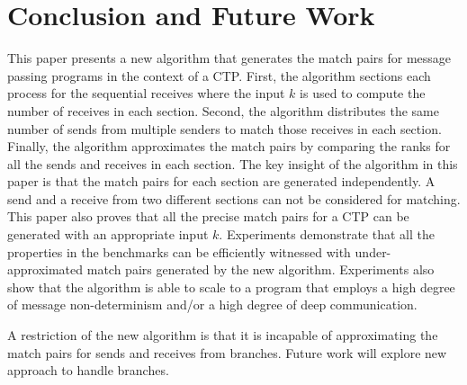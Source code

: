 \section{Conclusion and Future Work}
This paper presents a new algorithm that generates the match pairs for message passing programs in the context of a CTP.
First, the algorithm sections each process for the sequential receives where the input $k$ is used to compute the number of receives in each section.
Second, the algorithm distributes the same number of sends from multiple senders to match those receives in each section. Finally, the algorithm approximates the match pairs by comparing the ranks for all the sends and receives in each section. The key insight of the algorithm in this paper is that the match pairs for each section are generated independently. 
A send and a receive from two different sections can not be considered for matching. 
This paper also proves that all the precise match pairs for a CTP can be generated with an appropriate input $k$. Experiments demonstrate that all the properties in the benchmarks can be efficiently witnessed with under-approximated match pairs generated by the new algorithm. Experiments also show that the algorithm is able to scale to a program that employs a high degree of message non-determinism and/or a high degree of deep communication.

A restriction of the new algorithm is that it is incapable of approximating the match pairs for sends and receives from branches. Future work will explore new approach to handle branches.


